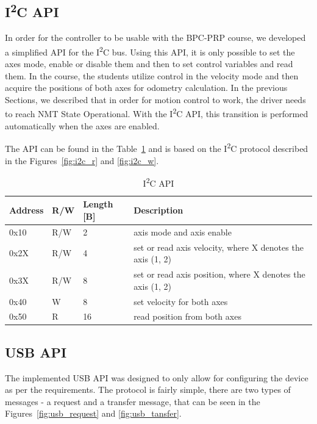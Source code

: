 \subsection{I\textsuperscript{2}C API}
In order for the controller to be usable with the BPC-PRP course, we developed a simplified API for the I\textsuperscript{2}C bus.
Using this API, it is only possible to set the axes mode, enable or disable them and then to set control variables and read them.
In the course, the students utilize control in the velocity mode and then acquire the positions of both axes for odometry calculation.
In the previous Sections, we described that in order for motion control to work, the driver needs to reach NMT State Operational.
With the I\textsuperscript{2}C API, this transition is performed automatically when the axes are enabled.

The API can be found in the Table~\ref{tab:i2c_api} and is based on the I\textsuperscript{2}C protocol described in the Figures~\ref{fig:i2c_r} and \ref{fig:i2c_w}.

\begin{table}[H]
    \centering
    \begin{tabular}{ |p{3cm}|p{2cm}|p{2cm}|p{6cm}| }
        \hline
        Address & R/W & Length [B] & Description \\
        \hline
        \hline
        0x10 & R/W & 2 & axis mode and axis enable \\
        \hline
        0x2X & R/W & 4 & set or read axis velocity, where X denotes the axis (1, 2) \\
        \hline
        0x3X & R/W & 8 & set or read axis position, where X denotes the axis (1, 2) \\
        \hline
        0x40 & W & 8 & set velocity for both axes \\
        \hline
        0x50 & R & 16 & read position from both axes \\
        \hline
    \end{tabular}
    \caption{I\textsuperscript{2}C API}
    \label{tab:i2c_api}
\end{table}

\subsection{USB API}
The implemented USB API was designed to only allow for configuring the device as per the requirements.
The protocol is fairly simple, there are two types of messages - a request and a transfer message, that can be seen in the Figures~\ref{fig:usb_request} and \ref{fig:usb_tansfer}.

